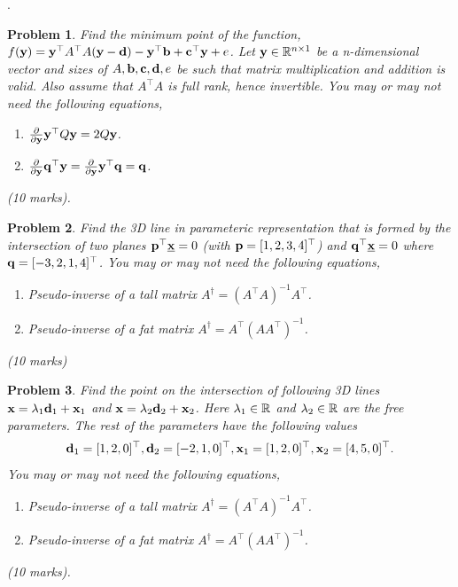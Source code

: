 \documentclass{article}
\newtheorem{prob}{Problem}
\begin{document}
\newpage
.

\newpage
\begin{prob}
  Find the minimum point of the function, $f(\mathbf{y}) = \mathbf{y}^\top A^\top A (\mathbf{y}-\mathbf{d}) - \mathbf{y}^\top\mathbf{b} +
  \mathbf{c}^\top \mathbf{y} + e$. Let $\mathbf{y} \in \mathbb{R}^{n \times 1}$ be a n-dimensional
  vector and sizes of $A, \mathbf{b}, \mathbf{c}, \mathbf{d}, e$
  be such that matrix multiplication and addition is valid. Also assume that $A^\top A$  is
  full rank, hence invertible. You may or may not need the following equations,
  \begin{enumerate}
      \item $\frac{\partial }{\partial \mathbf{y}} \mathbf{y}^\top Q \mathbf{y} = 2Q\mathbf{y}$.
      \item $\frac{\partial }{\partial \mathbf{y}}  \mathbf{q}^\top \mathbf{y} = \frac{\partial
        }{\partial \mathbf{y}}  \mathbf{y}^\top \mathbf{q} = \mathbf{q}$.
  \end{enumerate} (10 marks).
\end{prob}


\newpage
\begin{prob}
  Find the 3D line in parameteric representation that is formed by the intersection of two planes $\mathbf{p}^\top \underline{\mathbf{x}} = 0$ (with $\mathbf{p} = [1, 2,
  3, 4]^\top$)  and $\mathbf{q}^\top \underline{\mathbf{x}} = 0$ where $\mathbf{q} = [-3, 2, 1,
  4]^\top$.
  You may or may not need the following equations,
  \begin{enumerate}
    \item Pseudo-inverse of a tall matrix $A^\dagger = (A^\top A)^{-1} A^\top$.
    \item Pseudo-inverse of a fat matrix $A^\dagger = A^\top(A A^\top)^{-1} $.
  \end{enumerate}
  (10 marks)
\end{prob}

\newpage
\begin{prob}
  Find the point on the intersection of following 3D lines $\mathbf{x} = \lambda_1
  \mathbf{d}_1 +  \mathbf{x}_1$ and $\mathbf{x} = \lambda_2 \mathbf{d}_2 + \mathbf{x}_2$. Here $\lambda_1\in \mathbb{R}$ and
  $\lambda_2 \in \mathbb{R}$ are the free parameters. The rest of the parameters have
  the following values
  \begin{align*}
    \mathbf{d}_1 = [1, 2, 0]^\top,
    \mathbf{d}_2 = [-2, 1, 0]^\top,
    \mathbf{x}_1 = [1, 2, 0]^\top,
    \mathbf{x}_2 = [4, 5, 0]^\top.
    \end{align*} 
    You may or may not need the following equations,
    \begin{enumerate}
    \item Pseudo-inverse of a tall matrix $A^\dagger = (A^\top A)^{-1} A^\top$.
    \item Pseudo-inverse of a fat matrix $A^\dagger = A^\top(A A^\top)^{-1} $.
    \end{enumerate} (10 marks).
\end{prob}
\end{document}
